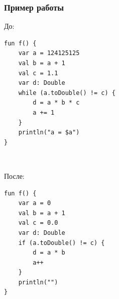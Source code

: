 \begin{frame}[fragile]
	\frametitle{Пример работы}
	\begin{minipage}{0.4\linewidth}
	До:
		\begin{lstlisting}[style=crs_cpp]
fun f() {
    var a = 124125125
    val b = a + 1
    val c = 1.1
    var d: Double
    while (a.toDouble() != c) {
        d = a * b * c
        a += 1
    }
    println("a = $a")
}
 \end{lstlisting}
	\end{minipage}
	\begin{minipage}{0.1\linewidth}
	\ \ 
	\end{minipage}
	\begin{minipage}{0.4\linewidth}
	После:
		\begin{lstlisting}[style=crs_cpp]
fun f() {
    var a = 0
    val b = a + 1
    val c = 0.0
    var d: Double
    if (a.toDouble() != c) {
        d = a * b
        a++
    }
    println("")
}
 \end{lstlisting}
	\end{minipage}
\end{frame}


